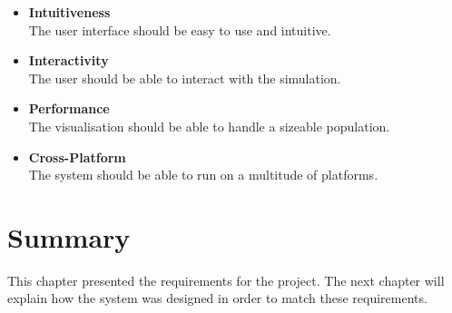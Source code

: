 \begin{itemize}
	\item \textbf{Intuitiveness} \\The user interface should be easy to use and intuitive.
	\item \textbf{Interactivity} \\The user should be able to interact with the simulation.
	\item \textbf{Performance} \\The visualisation should be able to handle a sizeable population.
	\item \textbf{Cross-Platform} \\The system should be able to run on a multitude of platforms.
\end{itemize}

\section{Summary}
This chapter presented the requirements for the project. The next chapter will explain how the system was designed in order to match these requirements.